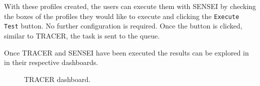 With these profiles created,
the users can execute them with SENSEI
by checking the boxes of the profiles they would like to execute
and clicking the \texttt{Execute Test} button.
No further configuration is required.
Once the button is clicked, similar to \ac{TRACER},
the task is sent to the queue.

Once \ac{TRACER} and SENSEI have been executed
the results can be explored in in their respective dashboards.

\begin{figure}[htpb]
  \centering
  \caption{TRACER dashboard.}
  \label{fig:ss-tracer-dashboard}
\end{figure}

